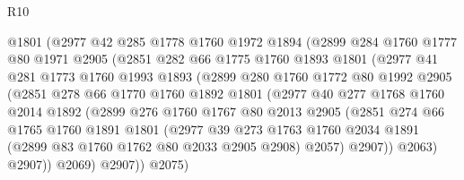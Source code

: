 \begin{lexlean}{R10}
\begin{coremodule}
                @1801
                (@2977
                  @42
                  @285
                  @1778
                  @1760
                  @1972
                  @1894
                  (@2899
                    @284
                    @1760
                    @1777
                    @80
                    @1971
                    @2905
                    (@2851
                      @282
                      @66
                      @1775
                      @1760
                      @1893
                      @1801
                      (@2977
                        @41
                        @281
                        @1773
                        @1760
                        @1993
                        @1893
                        (@2899
                          @280
                          @1760
                          @1772
                          @80
                          @1992
                          @2905
                          (@2851
                            @278
                            @66
                            @1770
                            @1760
                            @1892
                            @1801
                            (@2977
                              @40
                              @277
                              @1768
                              @1760
                              @2014
                              @1892
                              (@2899
                                @276
                                @1760
                                @1767
                                @80
                                @2013
                                @2905
                                (@2851
                                  @274
                                  @66
                                  @1765
                                  @1760
                                  @1891
                                  @1801
                                  (@2977
                                    @39
                                    @273
                                    @1763
                                    @1760
                                    @2034
                                    @1891
                                    (@2899 @83 @1760 @1762 @80 @2033 @2905 @2908)
                                    @2057)
                                  @2907))
                              @2063)
                            @2907))
                        @2069)
                      @2907))
                  @2075)

\end{coremodule}
\end{lexlean}
